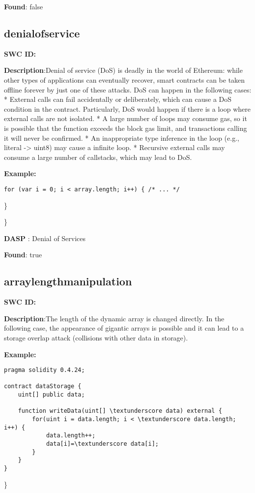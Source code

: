 \documentclass{article}
\begin{document}
\textbf{Found}: false

\subsection{denial\textunderscore of\textunderscore service} 
\textbf{SWC \textunderscore ID:} 

\textbf{Description}:Denial of service (DoS) is deadly in the world of Ethereum: while other types of applications can eventually recover, smart contracts can be taken offline forever by just one of these attacks. DoS can happen in the following cases:
* External calls can fail accidentally or deliberately, which can cause a DoS condition in the contract. Particularly, DoS would happen if there is a loop where external calls are not isolated.
* A large number of loops may consume gas, so it is possible that the function exceeds the block gas limit, and transactions calling it will never be confirmed.
* An inappropriate type inference in the loop (e.g., literal -> uint8) may cause a infinite loop.
* Recursive external calls may consume a large number of callstacks, which may lead to DoS.


\textbf{Example:} 
\begin{verbatim}
for (var i = 0; i < array.length; i++) { /* ... */

\end{verbatim}\} 

\} 

\textbf{DASP} : Denial of Services

\textbf{Found}: true

\subsection{array\textunderscore length\textunderscore manipulation} 
\textbf{SWC \textunderscore ID:} 

\textbf{Description}:The length of the dynamic array is changed directly. In the following case, the appearance of gigantic arrays is possible and it can lead to a storage overlap attack (collisions with other data in storage).


\textbf{Example:} 
\begin{verbatim}
pragma solidity 0.4.24;

contract dataStorage {
    uint[] public data;

    function writeData(uint[] \textunderscore data) external {
        for(uint i = data.length; i < \textunderscore data.length; i++) {
            data.length++;
            data[i]=\textunderscore data[i];
        }
    }
}

\end{verbatim}\} 
\end{document}
